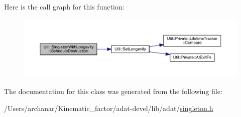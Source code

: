 Here is the call graph for this function\+:
\nopagebreak
\begin{figure}[H]
\begin{center}
\leavevmode
\includegraphics[width=350pt]{d0/de9/classUtil_1_1SingletonWithLongevity_acada28acaf9030754388818a79b0468d_cgraph}
\end{center}
\end{figure}


The documentation for this class was generated from the following file\+:\begin{DoxyCompactItemize}
\item 
/\+Users/archanar/\+Kinematic\+\_\+factor/adat-\/devel/lib/adat/\mbox{\hyperlink{adat-devel_2lib_2adat_2singleton_8h}{singleton.\+h}}\end{DoxyCompactItemize}
